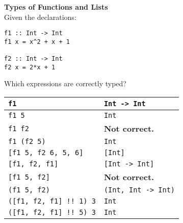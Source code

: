 \textbf{Types of Functions and Lists}\\
Given the declarations:
\begin{lstlisting}
f1 :: Int -> Int
f1 x = x^2 + x + 1

f2 :: Int -> Int
f2 x = 2*x + 1
\end{lstlisting}
Which expressions are correctly typed?\\
\begin{tabularx}{\linewidth}{|X|X|}
  \hline
  \lstinline|f1| & \lstinline|Int -> Int|\\
  \hline
  \lstinline|f1 5| & \lstinline|Int|\\
  \hline
  \lstinline|f1 f2| & \textbf{Not correct.}\\
  \hline
  \lstinline|f1 (f2 5)| & \lstinline|Int|\\
  \hline
  \lstinline|[f1 5, f2 6, 5, 6]| & \lstinline|[Int]|\\
  \hline
  \lstinline|[f1, f2, f1]| & \lstinline|[Int -> Int]|\\
  \hline
  \lstinline|[f1 5, f2]| & \textbf{Not correct.}\\
  \hline
  \lstinline|(f1 5, f2)| & \lstinline|(Int, Int -> Int)|\\
  \hline
  \lstinline|([f1, f2, f1] !! 1) 3| & \lstinline|Int|\\
  \hline
  \lstinline|([f1, f2, f1] !! 5) 3| & \lstinline|Int|\\
  \hline
\end{tabularx}

